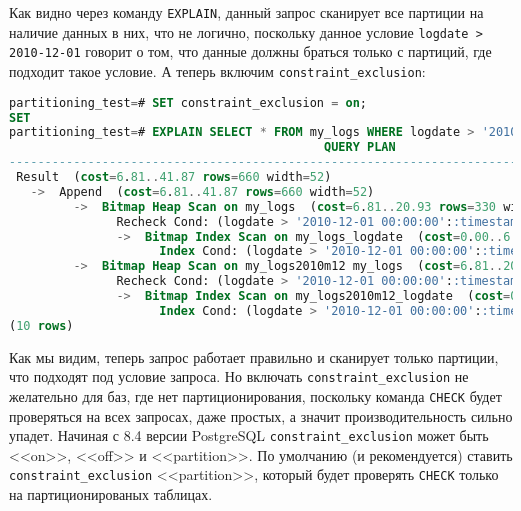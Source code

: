 Как видно через команду \lstinline!EXPLAIN!, данный запрос сканирует все партиции на наличие данных в них, что не логично, поскольку данное условие \lstinline!logdate > 2010-12-01! говорит о том, что данные должны браться только с партиций, где подходит такое условие. А теперь включим \lstinline!constraint_exclusion!:

\begin{lstlisting}[language=SQL,label=lst:partitioning15,caption=<<constraint\_exclusion>> ON]
partitioning_test=# SET constraint_exclusion = on;
SET
partitioning_test=# EXPLAIN SELECT * FROM my_logs WHERE logdate > '2010-12-01';
                                            QUERY PLAN
---------------------------------------------------------------------------------------------------
 Result  (cost=6.81..41.87 rows=660 width=52)
   ->  Append  (cost=6.81..41.87 rows=660 width=52)
         ->  Bitmap Heap Scan on my_logs  (cost=6.81..20.93 rows=330 width=52)
               Recheck Cond: (logdate > '2010-12-01 00:00:00'::timestamp without time zone)
               ->  Bitmap Index Scan on my_logs_logdate  (cost=0.00..6.73 rows=330 width=0)
                     Index Cond: (logdate > '2010-12-01 00:00:00'::timestamp without time zone)
         ->  Bitmap Heap Scan on my_logs2010m12 my_logs  (cost=6.81..20.93 rows=330 width=52)
               Recheck Cond: (logdate > '2010-12-01 00:00:00'::timestamp without time zone)
               ->  Bitmap Index Scan on my_logs2010m12_logdate  (cost=0.00..6.73 rows=330 width=0)
                     Index Cond: (logdate > '2010-12-01 00:00:00'::timestamp without time zone)
(10 rows)
\end{lstlisting}

Как мы видим, теперь запрос работает правильно и сканирует только партиции, что подходят под условие запроса. Но включать \lstinline!constraint_exclusion! не желательно для баз, где нет партиционирования, поскольку команда \lstinline!CHECK! будет проверяться на всех запросах, даже простых, а значит производительность сильно упадет. Начиная с 8.4 версии PostgreSQL \lstinline!constraint_exclusion! может быть <<on>>, <<off>> и <<partition>>. По умолчанию (и рекомендуется) ставить \lstinline!constraint_exclusion! <<partition>>, который будет проверять \lstinline!CHECK! только на партиционированых таблицах.
